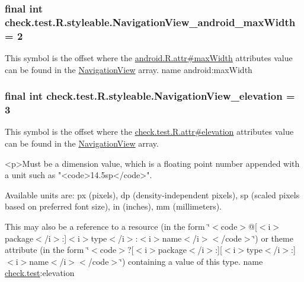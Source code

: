 \subsubsection[{Navigation\+View\+\_\+android\+\_\+max\+Width}]{\setlength{\rightskip}{0pt plus 5cm}final int check.\+test.\+R.\+styleable.\+Navigation\+View\+\_\+android\+\_\+max\+Width = 2\hspace{0.3cm}{\ttfamily [static]}}\label{classcheck_1_1test_1_1_r_1_1styleable_a14840a3ae29e9331de83b023e02fa994}
This symbol is the offset where the \hyperlink{}{android.\+R.\+attr\#max\+Width} attribute\textquotesingle{}s value can be found in the \hyperlink{classcheck_1_1test_1_1_r_1_1styleable_a70ac59d722f1e4aac4b206dcf5f53107}{Navigation\+View} array.  name android\+:max\+Width \hypertarget{classcheck_1_1test_1_1_r_1_1styleable_a88ddf97958b48ba8933c1d24db5015fa}{}
\subsubsection[{Navigation\+View\+\_\+elevation}]{\setlength{\rightskip}{0pt plus 5cm}final int check.\+test.\+R.\+styleable.\+Navigation\+View\+\_\+elevation = 3\hspace{0.3cm}{\ttfamily [static]}}\label{classcheck_1_1test_1_1_r_1_1styleable_a88ddf97958b48ba8933c1d24db5015fa}
This symbol is the offset where the \hyperlink{classcheck_1_1test_1_1_r_1_1attr_acf20b055f3e563dc5c426990bf2b3b7e}{check.\+test.\+R.\+attr\#elevation} attribute\textquotesingle{}s value can be found in the \hyperlink{classcheck_1_1test_1_1_r_1_1styleable_a70ac59d722f1e4aac4b206dcf5f53107}{Navigation\+View} array.

\begin{DoxyVerb}      <p>Must be a dimension value, which is a floating point number appended with a unit such as "<code>14.5sp</code>".
\end{DoxyVerb}
 Available units are\+: px (pixels), dp (density-\/independent pixels), sp (scaled pixels based on preferred font size), in (inches), mm (millimeters). 

This may also be a reference to a resource (in the form \char`\"{}$<$code$>$@\mbox{[}$<$i$>$package$<$/i$>$\+:\mbox{]}$<$i$>$type$<$/i$>$\+:$<$i$>$name$<$/i$>$$<$/code$>$\char`\"{}) or theme attribute (in the form \char`\"{}$<$code$>$?\mbox{[}$<$i$>$package$<$/i$>$\+:\mbox{]}\mbox{[}$<$i$>$type$<$/i$>$\+:\mbox{]}$<$i$>$name$<$/i$>$$<$/code$>$\char`\"{}) containing a value of this type.  name \hyperlink{namespacecheck_1_1test}{check.\+test}\+:elevation \hypertarget{classcheck_1_1test_1_1_r_1_1styleable_ab9421b2c3084fab03258249932b7e0fd}{}
